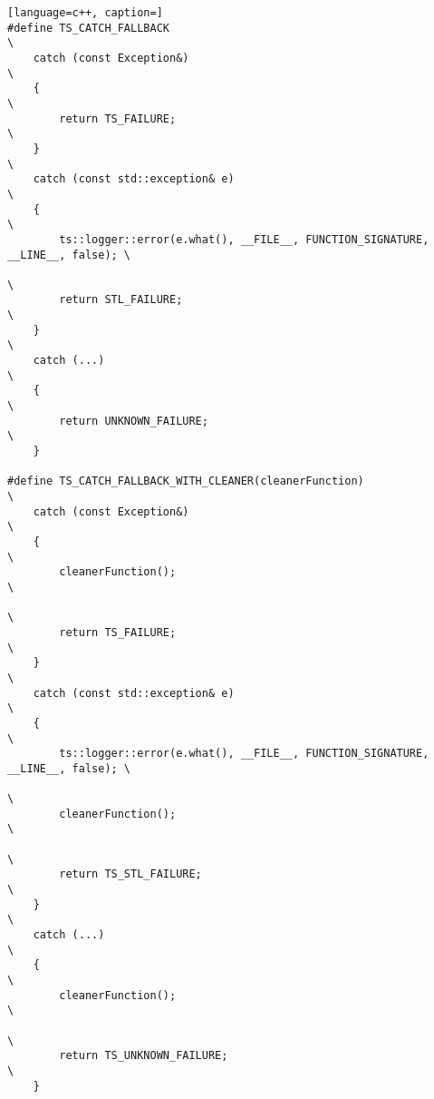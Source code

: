 \begin{lstlisting}[language=c++, caption=]
#define TS_CATCH_FALLBACK                                                           \
    catch (const Exception&)                                                        \
    {                                                                               \
        return TS_FAILURE;                                                          \
    }                                                                               \
    catch (const std::exception& e)                                                 \
    {                                                                               \
        ts::logger::error(e.what(), __FILE__, FUNCTION_SIGNATURE, __LINE__, false); \
                                                                                    \
        return STL_FAILURE;                                                         \
    }                                                                               \
    catch (...)                                                                     \
    {                                                                               \
        return UNKNOWN_FAILURE;                                                     \
    }

#define TS_CATCH_FALLBACK_WITH_CLEANER(cleanerFunction)                             \
    catch (const Exception&)                                                        \
    {                                                                               \
        cleanerFunction();                                                          \
                                                                                    \
        return TS_FAILURE;                                                          \
    }                                                                               \
    catch (const std::exception& e)                                                 \
    {                                                                               \
        ts::logger::error(e.what(), __FILE__, FUNCTION_SIGNATURE, __LINE__, false); \
                                                                                    \
        cleanerFunction();                                                          \
                                                                                    \
        return TS_STL_FAILURE;                                                      \
    }                                                                               \
    catch (...)                                                                     \
    {                                                                               \
        cleanerFunction();                                                          \
                                                                                    \
        return TS_UNKNOWN_FAILURE;                                                  \
    }
\end{lstlisting}

